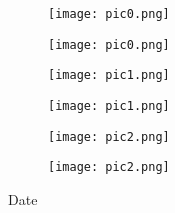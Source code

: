 \documentclass[10pt,a6paper,DIV=60]{scrartcl}
\begin{document}
\begin{figure}[h]
  \begin{minipage}[b]{0.48\linewidth}
    \texttt{[image: pic0.png]}
  \end{minipage}
  \hfill
  \begin{minipage}[b]{0.48\linewidth}
    \texttt{[image: pic0.png]}
  \end{minipage}
\end{figure}
\vspace{-1em}
\begin{figure}[h]
  \begin{minipage}[b]{0.48\linewidth}
    \texttt{[image: pic1.png]}
  \end{minipage}
  \hfill
  \begin{minipage}[b]{0.48\linewidth}
    \texttt{[image: pic1.png]}
  \end{minipage}
\end{figure}
\vspace{-1em}
\begin{figure}[h]
  \begin{minipage}[b]{0.48\linewidth}
    \texttt{[image: pic2.png]}
  \end{minipage}
  \hfill
  \begin{minipage}[b]{0.48\linewidth}
    \texttt{[image: pic2.png]}
  \end{minipage}
\end{figure}
\vfill
\tiny{Date}
\end{document}
